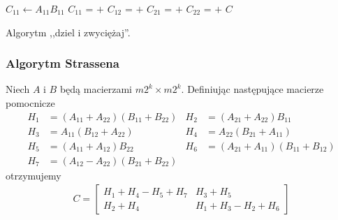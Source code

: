 

\begin{algorithm}[h]
\centering
\begin{algorithmic}[1]
\State \(C_11\gets A_{11}B_{11}\)
\Else
\State \(C_{11}\) =  $+$ 
\State \(C_{12}\) =  $+$ 
\State \(C_{21}\) =  $+$ 
\State \(C_{22}\) =  $+$ 
\EndIf
\State \Return \(C\)
\EndFunction
\end{algorithmic}
\caption{Algorytm ,,dziel i zwyciężaj''.}
\label{alg:divideconquer}
\end{algorithm}

\subsubsection{Algorytm Strassena}
Niech \(A\) i \(B\) będą macierzami \(m2^k\times m2^k\). Definiując następujące macierze pomocnicze
\begin{align*}
H_1 &= (A_{11}+A_{22})(B_{11}+B_{22})&
 H_2 &= (A_{21}+A_{22})B_{11}\\
H_3 &= A_{11}(B_{12} + A_{22})&
 H_4 &= A_{22}(B_{21} + A_{11})\\
H_5 &= (A_{11}+A_{12})B_{22}&
 H_6 &= (A_{21} + A_{11})(B_{11} + B_{12}) \\
H_7 &= (A_{12}-A_{22})(B_{21}+B_{22}) 
\end{align*}
otrzymujemy
\begin{align}
C = \begin{bmatrix}
H_1+H_4-H_5+H_7& H_3+H_5\\
H_2+H_4& H_1+H_3-H_2+H_6
\end{bmatrix}
\end{align}

